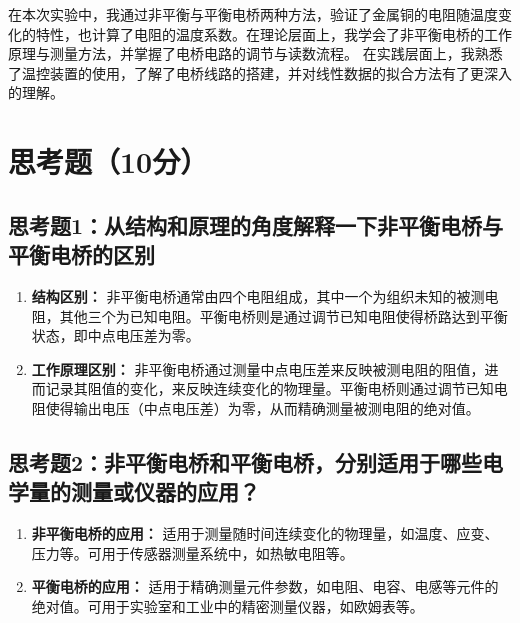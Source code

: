 \documentclass[]{../../templates/Report}%
\begin{document}
\begin{fullreportonly}
在本次实验中，我通过非平衡与平衡电桥两种方法，验证了金属铜的电阻随温度变化的特性，也计算了电阻的温度系数。在理论层面上，我学会了非平衡电桥的工作原理与测量方法，并掌握了电桥电路的调节与读数流程。
在实践层面上，我熟悉了温控装置的使用，了解了电桥线路的搭建，并对线性数据的拟合方法有了更深入的理解。


\section{思考题（10分）}

\subsection{思考题1：从结构和原理的角度解释一下非平衡电桥与平衡电桥的区别}
\begin{enumerate}[label=(\arabic*).,leftmargin=3em]
    \item \textbf{结构区别：} 非平衡电桥通常由四个电阻组成，其中一个为组织未知的被测电阻，其他三个为已知电阻。平衡电桥则是通过调节已知电阻使得桥路达到平衡状态，即中点电压差为零。
    \item \textbf{工作原理区别：} 非平衡电桥通过测量中点电压差来反映被测电阻的阻值，进而记录其阻值的变化，来反映连续变化的物理量。平衡电桥则通过调节已知电阻使得输出电压（中点电压差）为零，从而精确测量被测电阻的绝对值。
\end{enumerate}
\subsection{思考题2：非平衡电桥和平衡电桥，分别适用于哪些电学量的测量或仪器的应用？}
\begin{enumerate}[label=(\arabic*).,leftmargin=3em]
    \item \textbf{非平衡电桥的应用：} 适用于测量随时间连续变化的物理量，如温度、应变、压力等。可用于传感器测量系统中，如热敏电阻等。
    \item \textbf{平衡电桥的应用：} 适用于精确测量元件参数，如电阻、电容、电感等元件的绝对值。可用于实验室和工业中的精密测量仪器，如欧姆表等。
\end{enumerate}

\end{fullreportonly}
\insertnotes
\end{document}
